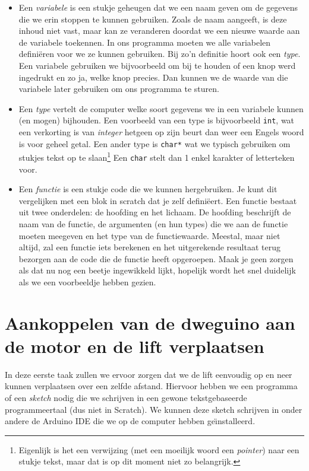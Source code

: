 \documentclass[a4paper, 10pt]{article}
\begin{document}
\begin{itemize}
\item
    Een {\em variabele} is een stukje geheugen dat we een naam geven om de gegevens die we erin stoppen te kunnen gebruiken.
    Zoals de naam aangeeft, is deze inhoud niet vast, maar kan ze veranderen doordat we een nieuwe waarde aan de variabele toekennen.
    In ons programma moeten we alle variabelen defini\"eren voor we ze kunnen gebruiken. Bij zo'n definitie hoort ook een {\em type}.
    Een variabele gebruiken we bijvoorbeeld om bij te houden of een knop werd ingedrukt en zo ja, welke knop precies. Dan kunnen
    we de waarde van die variabele later gebruiken om ons programma te sturen.
\item
    Een {\em type} vertelt de computer welke soort gegevens we in een variabele kunnen (en mogen) bijhouden. Een voorbeeld
    van een type is bijvoorbeeld \texttt{int}, wat een verkorting is van {\em integer} hetgeen op zijn beurt dan weer
    een Engels woord is voor geheel getal. Een ander type is \texttt{char*} wat we typisch gebruiken om stukjes tekst op
    te slaan\footnote{Eigenlijk is het een verwijzing (met een moeilijk woord een {\em pointer}) naar een stukje tekst, maar dat is
    op dit moment niet zo belangrijk.} Een \texttt{char} stelt dan 1 enkel karakter of letterteken voor.
\item
    Een {\em functie} is een stukje code die we kunnen hergebruiken. Je kunt dit vergelijken met een blok in scratch dat je zelf
    defini\"eert. Een functie bestaat uit twee onderdelen: de hoofding en het lichaam. De hoofding beschrijft de naam van
    de functie, de argumenten (en hun types) die we aan de functie moeten meegeven en het type van de functiewaarde. Meestal,
    maar niet altijd, zal een functie iets berekenen en het uitgerekende resultaat terug bezorgen aan de code die de functie
    heeft opgeroepen. Maak je geen zorgen als dat nu nog een beetje ingewikkeld lijkt, hopelijk wordt het snel duidelijk
    als we een voorbeeldje hebben gezien.
\end{itemize}


\section{Aankoppelen van de dweguino aan de motor en de lift verplaatsen}

In deze eerste taak zullen we ervoor zorgen dat we de lift eenvoudig op en neer kunnen verplaatsen over een zelfde
afstand. Hiervoor hebben we een programma of een {\em sketch} nodig die we schrijven in een gewone tekstgebaseerde
programmeertaal (dus niet in Scratch). We kunnen deze sketch schrijven in onder andere de Arduino IDE die we op de
computer hebben ge\"\i nstalleerd.
\end{document}
